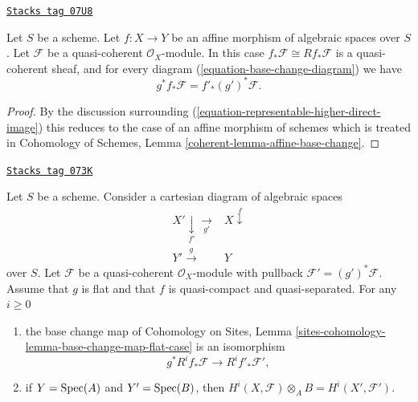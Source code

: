 \begin{lemma}
\label{spaces-cohomology-lemma-affine-base-change}
\href{https://stacks.math.columbia.edu/tag/07U8}{\texttt{Stacks tag 07U8}}

Let $S$ be a scheme. Let $f : X \to Y$ be an affine morphism of algebraic
spaces over $S$. Let $\mathcal{F}$ be a quasi-coherent $\mathcal{O}_X$-module.
In this case $f_*\mathcal{F} \cong Rf_*\mathcal{F}$ is a quasi-coherent
sheaf, and for every diagram (\ref{equation-base-change-diagram})
we have
$$
g^*f_*\mathcal{F} = f'_*(g')^*\mathcal{F}.
$$
\end{lemma}

\begin{proof}
By the discussion surrounding
(\ref{equation-representable-higher-direct-image})
this reduces to the case of an affine morphism of schemes which
is treated in Cohomology of Schemes, Lemma
\ref{coherent-lemma-affine-base-change}.
\end{proof}

\begin{lemma}

\label{spaces-cohomology-lemma-flat-base-change-cohomology}
\href{https://stacks.math.columbia.edu/tag/073K}{\texttt{Stacks tag 073K}}

Let $S$ be a scheme. Consider a cartesian diagram of algebraic spaces
$$
\begin{array}{cc}X' \underset{f'}{\downarrow}\underset{g'}{\longrightarrow} & X \overset{f}{\downarrow} \\ Y' \overset{g}{\longrightarrow} & Y\end{array}
$$
over $S$.
Let $\mathcal{F}$ be a quasi-coherent $\mathcal{O}_X$-module
with pullback $\mathcal{F}' = (g')^*\mathcal{F}$.
Assume that $g$ is flat and that $f$ is quasi-compact and quasi-separated.
For any $i \geq 0$
\begin{enumerate}
\item the base change map of
Cohomology on Sites, Lemma
\ref{sites-cohomology-lemma-base-change-map-flat-case}
is an isomorphism
$$
g^*R^if_*\mathcal{F} \longrightarrow R^if'_*\mathcal{F}',
$$
\item if $Y = \operatorname{Spec}(A)$ and $Y' = \operatorname{Spec}(B)$, then
$H^i(X, \mathcal{F}) \otimes_A B = H^i(X', \mathcal{F}')$.
\end{enumerate}
\end{lemma}

